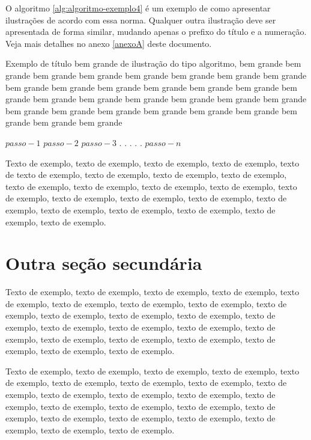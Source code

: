 \documentclass[
	12pt,				%
	oneside,			%
	a4paper,			%
	english,			%
	brazil				%
	]{abntex2ppgsi}
\begin{document}
O algoritmo \ref{alg:algoritmo-exemplo4} é um exemplo de como apresentar ilustrações de acordo com essa norma. Qualquer outra ilustração deve ser apresentada de forma similar, mudando apenas o prefixo do título e a numeração. Veja mais detalhes no anexo \ref{anexoA} deste documento.

\begin{algorithm}[htbp]
\caption{Exemplo de título bem grande de ilustração do tipo algoritmo, bem grande bem grande bem grande bem grande bem grande bem grande bem grande bem grande bem grande bem grande bem grande bem grande bem grande bem grande bem grande bem grande bem grande bem grande bem grande bem grande bem grande bem grande bem grande bem grande bem grande bem grande bem grande bem grande bem grande bem grande}
\label{alg:algoritmo-exemplo4}
\begin{algorithmic}[1]
\State $passo-1$
\State $passo-2$
\State $passo-3$
\State $.$
\State $.$
\State $.$
\State $.$
\State $.$
\State $passo-n$
\EndProcedure
\end{algorithmic}
\end{algorithm}


Texto de exemplo, texto de exemplo, texto de exemplo, texto de exemplo, texto de texto de exemplo, texto de exemplo, texto de exemplo, texto de exemplo, texto de exemplo, texto de exemplo, texto de exemplo, texto de exemplo, texto de exemplo, texto de exemplo, texto de exemplo, texto de exemplo, texto de exemplo, texto de exemplo, texto de exemplo, texto de exemplo, texto de exemplo, texto de exemplo.

\section{Outra seção secundária}

Texto de exemplo, texto de exemplo, texto de exemplo, texto de exemplo, texto de exemplo, texto de exemplo, texto de exemplo, texto de exemplo, texto de exemplo, texto de exemplo, texto de exemplo, texto de exemplo, texto de exemplo, texto de exemplo, texto de exemplo, texto de exemplo, texto de exemplo, texto de exemplo, texto de exemplo, texto de exemplo, texto de exemplo, texto de exemplo, texto de exemplo.

Texto de exemplo, texto de exemplo, texto de exemplo, texto de exemplo, texto de exemplo, texto de exemplo, texto de exemplo, texto de exemplo, texto de exemplo, texto de exemplo, texto de exemplo, texto de exemplo, texto de exemplo, texto de exemplo, texto de exemplo, texto de exemplo, texto de exemplo, texto de exemplo, texto de exemplo, texto de exemplo, texto de exemplo, texto de exemplo, texto de exemplo.
\end{document}
